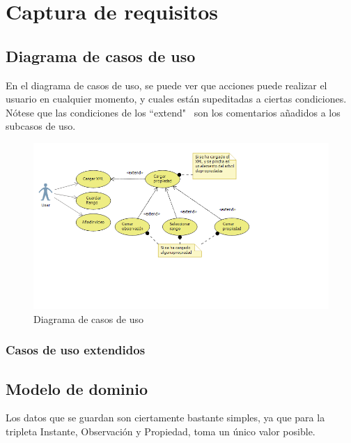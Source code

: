 \chapter{Captura de requisitos}
%

\section{Diagrama de casos de uso}
En el diagrama de casos de uso, se puede ver que acciones puede realizar el usuario en cualquier momento, y cuales
est\'an supeditadas a ciertas condiciones. N\'otese que las condiciones de los ``extend" \ son los comentarios a\~nadidos
a los subcasos de uso.

\begin{figure}[h]
\centering
\includegraphics[width=1.0\linewidth]{./Figures/useCaseDiagram.png}
\caption[Diagrama de casos de uso]{Diagrama de casos de uso}
\label{fig:useCaseDiagram}
\end{figure}

\subsection{Casos de uso extendidos}

\section{Modelo de dominio}
Los datos que se guardan son ciertamente bastante simples, ya que para la tripleta Instante, Observaci\'on y Propiedad,
toma un \'unico valor posible. 


